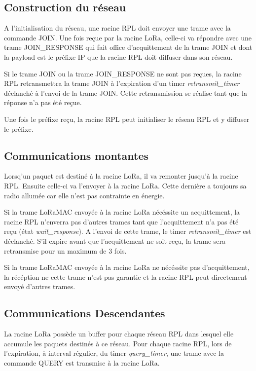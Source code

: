 \subsection{Construction du réseau}
    A l'initialisation du réseau, une racine RPL doit envoyer une trame avec la commande JOIN. Une fois reçue par la racine LoRa, celle-ci va répondre avec une trame JOIN\_RESPONSE qui fait office d'acquittement de la trame JOIN et dont la payload est le préfixe IP que la racine RPL doit diffuser dans son réseau.

    Si le trame JOIN ou la trame JOIN\_RESPONSE ne sont pas reçues, la racine RPL retransmettra la trame JOIN à l'expiration d'un timer \textit{retransmit\_timer} déclanché à l'envoi de la trame JOIN. Cette retransmission se réalise tant que la réponse n'a pas été reçue.

    Une fois le préfixe reçu, la racine RPL peut initialiser le réseau RPL et y diffuser le préfixe.

\subsection{Communications montantes}
    Lorsq'un paquet est destiné à la racine LoRa, il va remonter jusqu'à la racine RPL. Ensuite celle-ci va l'envoyer à la racine LoRa. Cette dernière a toujours sa radio allumée car elle n'est pas contrainte en énergie.

    Si la trame LoRaMAC envoyée à la racine LoRa nécéssite un acquittement, la racine RPL n'enverra pas d'autres trames tant que l'acquittement n'a pas été reçu (état \textit{wait\_response}).
    A l'envoi de cette trame, le timer \textit{retransmit\_timer} est déclanché. S'il expire avant que l'acquittement ne soit reçu, la trame sera retransmise pour un maximum de 3 fois.

    Si la trame LoRaMAC envoyée à la racine LoRa ne nécéssite pas d'acquittement, la récéption ne cette trame n'est pas garantie et la racine RPL peut directement envoyé d'autres trames.

\subsection{Communications Descendantes}
    La racine LoRa possède un buffer pour chaque réseau RPL dans lesquel elle accumule les paquets destinés à ce réseau. Pour chaque racine RPL, lors de l'expiration, à interval régulier, du timer \textit{query\_timer}, une trame avec la commande QUERY est transmise à la racine LoRa.

